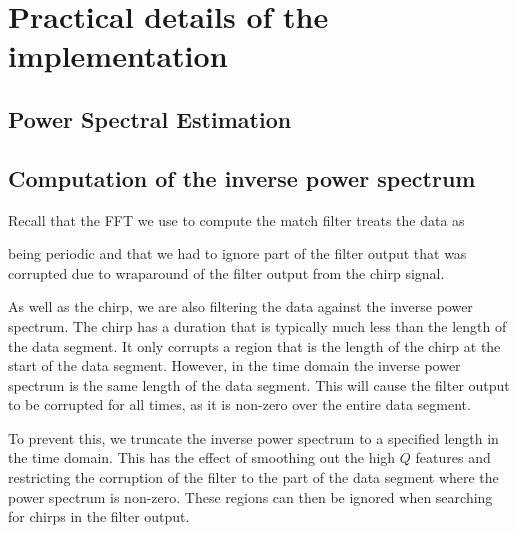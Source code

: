 \section{Practical details of the implementation}
\label{s:practical}

\subsection{Power Spectral Estimation}
\label{ss:psd}

\subsection{Computation of the inverse power spectrum}
\label{ss:invspec}
Recall that the FFT we use to compute the match filter treats the data as

being periodic and that we had to ignore part of the filter output that was
corrupted due to wraparound of the filter output from the chirp signal. 

As well as the chirp, we are also filtering the data against the inverse power
spectrum. The chirp has a duration that is typically much less than the
length of the data segment. It only corrupts a region that is the length of
the chirp at the start of the data segment. However, in the time domain the
inverse power spectrum is the same length of the data segment. This will cause
the filter output to be corrupted for all times, as it is non-zero over the
entire data segment.

To prevent this, we truncate the inverse power spectrum to a specified length
in the time domain. This has the effect of smoothing out the high $Q$ features
and restricting the corruption of the filter to the part of the data segment
where the power spectrum is non-zero. These regions can then be ignored when
searching for chirps in the filter output.

